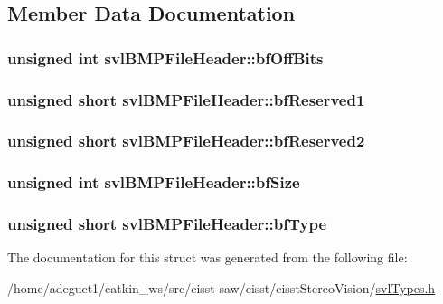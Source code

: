 \subsection{Member Data Documentation}
\hypertarget{structsvl_b_m_p_file_header_ac33b347e5a22419e98cd48c7b28f02da}{
\subsubsection[{bf\-Off\-Bits}]{\setlength{\rightskip}{0pt plus 5cm}unsigned int svl\-B\-M\-P\-File\-Header\-::bf\-Off\-Bits}}\label{structsvl_b_m_p_file_header_ac33b347e5a22419e98cd48c7b28f02da}
\hypertarget{structsvl_b_m_p_file_header_a497a191d181f6f89f2c6265d6a5cca6a}{
\subsubsection[{bf\-Reserved1}]{\setlength{\rightskip}{0pt plus 5cm}unsigned short svl\-B\-M\-P\-File\-Header\-::bf\-Reserved1}}\label{structsvl_b_m_p_file_header_a497a191d181f6f89f2c6265d6a5cca6a}
\hypertarget{structsvl_b_m_p_file_header_aa184ab5d6c02e6f008dc0ee002efdaf5}{
\subsubsection[{bf\-Reserved2}]{\setlength{\rightskip}{0pt plus 5cm}unsigned short svl\-B\-M\-P\-File\-Header\-::bf\-Reserved2}}\label{structsvl_b_m_p_file_header_aa184ab5d6c02e6f008dc0ee002efdaf5}
\hypertarget{structsvl_b_m_p_file_header_afbba986523d6c2e3c43a9f34f11013b2}{
\subsubsection[{bf\-Size}]{\setlength{\rightskip}{0pt plus 5cm}unsigned int svl\-B\-M\-P\-File\-Header\-::bf\-Size}}\label{structsvl_b_m_p_file_header_afbba986523d6c2e3c43a9f34f11013b2}
\hypertarget{structsvl_b_m_p_file_header_a4e1fb2f5208ced50a9c740d301c967b7}{
\subsubsection[{bf\-Type}]{\setlength{\rightskip}{0pt plus 5cm}unsigned short svl\-B\-M\-P\-File\-Header\-::bf\-Type}}\label{structsvl_b_m_p_file_header_a4e1fb2f5208ced50a9c740d301c967b7}


The documentation for this struct was generated from the following file\-:\begin{DoxyCompactItemize}
\item 
/home/adeguet1/catkin\-\_\-ws/src/cisst-\/saw/cisst/cisst\-Stereo\-Vision/\hyperlink{svl_types_8h}{svl\-Types.\-h}\end{DoxyCompactItemize}
